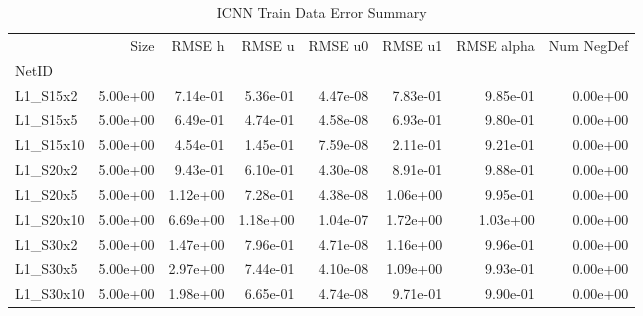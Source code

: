 \documentclass{article}
\theoremstyle{remark}
\numberwithin{equation}{subsection}
\begin{document}
\begin{table}[H]
	
\begin{tabular}{lrrrrrrr}
	\toprule
	{} &     Size &   RMSE h &   RMSE u &  RMSE u0 &  RMSE u1 &  RMSE alpha &  Num NegDef \\
	NetID     &          &          &          &          &          &             &             \\
	\midrule
	L1\_S15x2  & 5.00e+00 & 7.14e-01 & 5.36e-01 & 4.47e-08 & 7.83e-01 &    9.85e-01 &    0.00e+00 \\
	L1\_S15x5  & 5.00e+00 & 6.49e-01 & 4.74e-01 & 4.58e-08 & 6.93e-01 &    9.80e-01 &    0.00e+00 \\
	L1\_S15x10 & 5.00e+00 & 4.54e-01 & 1.45e-01 & 7.59e-08 & 2.11e-01 &    9.21e-01 &    0.00e+00 \\
	L1\_S20x2  & 5.00e+00 & 9.43e-01 & 6.10e-01 & 4.30e-08 & 8.91e-01 &    9.88e-01 &    0.00e+00 \\
	L1\_S20x5  & 5.00e+00 & 1.12e+00 & 7.28e-01 & 4.38e-08 & 1.06e+00 &    9.95e-01 &    0.00e+00 \\
	L1\_S20x10 & 5.00e+00 & 6.69e+00 & 1.18e+00 & 1.04e-07 & 1.72e+00 &    1.03e+00 &    0.00e+00 \\
	L1\_S30x2  & 5.00e+00 & 1.47e+00 & 7.96e-01 & 4.71e-08 & 1.16e+00 &    9.96e-01 &    0.00e+00 \\
	L1\_S30x5  & 5.00e+00 & 2.97e+00 & 7.44e-01 & 4.10e-08 & 1.09e+00 &    9.93e-01 &    0.00e+00 \\
	L1\_S30x10 & 5.00e+00 & 1.98e+00 & 6.65e-01 & 4.74e-08 & 9.71e-01 &    9.90e-01 &    0.00e+00 \\
	\bottomrule
\end{tabular}

\caption{ICNN Train Data Error Summary}
\end{table}
\end{document}
